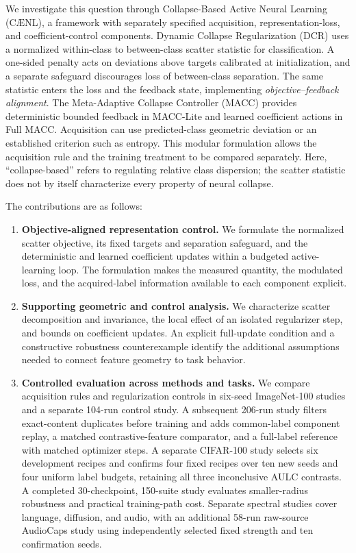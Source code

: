 \documentclass[10pt,a4paper,twocolumn]{article}
\newcommand{\model}{C\AE{}NL}
\begin{document}
We investigate this question through Collapse-Based Active Neural
Learning (\model{}), a framework with separately specified acquisition,
representation-loss, and coefficient-control components. Dynamic
Collapse Regularization (DCR) uses a normalized within-class to
between-class scatter statistic for classification. A one-sided penalty
acts on deviations above targets calibrated at initialization, and a
separate safeguard discourages loss of between-class separation. The
same statistic enters the loss and the feedback state, implementing
\emph{objective--feedback alignment}. The Meta-Adaptive Collapse
Controller (MACC) provides deterministic bounded feedback in MACC-Lite
and learned coefficient actions in Full MACC. Acquisition can use
predicted-class geometric deviation or an established criterion such
as entropy. This modular formulation allows the acquisition rule and
the training treatment to be compared separately. Here, ``collapse-based''
refers to regulating relative class dispersion; the scatter statistic
does not by itself characterize every property of neural collapse.

The contributions are as follows:
\begin{enumerate}
\item \textbf{Objective-aligned representation control.}
We formulate the normalized scatter objective, its fixed targets and
separation safeguard, and the deterministic and learned coefficient
updates within a budgeted active-learning loop. The formulation makes
the measured quantity, the modulated loss, and the acquired-label
information available to each component explicit.
\item \textbf{Supporting geometric and control analysis.}
We characterize scatter decomposition and invariance, the local effect
of an isolated regularizer step, and bounds on coefficient updates.
An explicit full-update condition and a constructive robustness
counterexample identify the additional assumptions needed to connect
feature geometry to task behavior.
\item \textbf{Controlled evaluation across methods and tasks.}
We compare acquisition rules and regularization controls in six-seed
ImageNet-100 studies and a separate 104-run control study. A subsequent
206-run study filters exact-content duplicates before training and adds
common-label component replay, a matched contrastive-feature comparator,
and a full-label reference with matched optimizer steps. A separate
CIFAR-100 study selects six development recipes and confirms four
fixed recipes over ten new seeds and four uniform label budgets,
retaining all three inconclusive AULC contrasts. A completed
30-checkpoint, 150-suite study evaluates smaller-radius robustness and
practical training-path cost. Separate spectral studies cover language,
diffusion, and audio, with an additional 58-run raw-source AudioCaps study
using independently selected fixed strength and ten confirmation seeds.
\end{enumerate}
\end{document}
